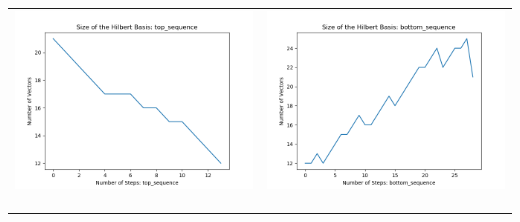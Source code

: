 \documentclass[10pt]{article}
\begin{document}
\begin{tabular}{c|c}
\begin{minipage}{.45\textwidth}
\includegraphics[width=\textwidth]{"DATA/5d/6 generators 2 bound D/top_sequence SIZE"}
\end{minipage} &
\begin{minipage}{.45\textwidth}
\includegraphics[width=\textwidth]{"DATA/5d/6 generators 2 bound D bottomup/bottom_sequence SIZE"}
\end{minipage} \\ \\
\hline \\\begin{minipage}{.45\textwidth}

\end{minipage}
\end{tabular}
\end{document}
